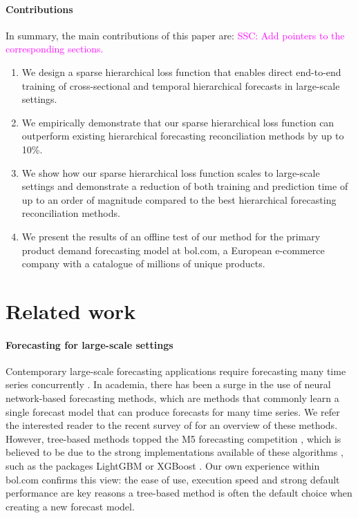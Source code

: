 \documentclass[preprint, 3p, times, twocolumn]{elsarticle}
\newcommand{\ssc}[1]{\textcolor{magenta}{SSC: #1.}}
\begin{document}
\paragraph{Contributions} In summary, the main contributions of this paper are: \ssc{Add pointers to the corresponding sections}
\begin{enumerate}
  \item We design a sparse hierarchical loss function that enables direct end-to-end training of cross-sectional and temporal hierarchical forecasts in large-scale settings.
  \item We empirically demonstrate that our sparse hierarchical loss function can outperform existing hierarchical forecasting reconciliation methods by up to 10\%.
  \item We show how our sparse hierarchical loss function scales to large-scale settings and demonstrate a reduction of both training and prediction time of up to an order of magnitude compared to the best hierarchical forecasting reconciliation methods.
  \item We present the results of an offline test of our method for the primary product demand forecasting model at bol.com, a European e-commerce company with a catalogue of millions of unique products.
\end{enumerate}

\section{Related work} \label{sec:relwork}

\paragraph{Forecasting for large-scale settings} Contemporary large-scale forecasting applications require forecasting many time series concurrently \cite{bose_probabilistic_2017}. In academia, there has been a surge in the use of neural network-based forecasting methods, which are methods that commonly learn a single forecast model that can produce forecasts for many time series. We refer the interested reader to the recent survey of \citet{benidis_deep_2023} for an overview of these methods. However, tree-based methods topped the M5 forecasting competition \cite{makridakis_m5_2022}, which is believed to be due to the strong implementations available of these algorithms \cite{januschowski_forecasting_2022}, such as the packages LightGBM \cite{ke_lightgbm_2017} or XGBoost \cite{chen_xgboost_2016}. Our own experience within bol.com confirms this view: the ease of use, execution speed and strong default performance are key reasons a tree-based method is often the default choice when creating a new forecast model.
\end{document}
